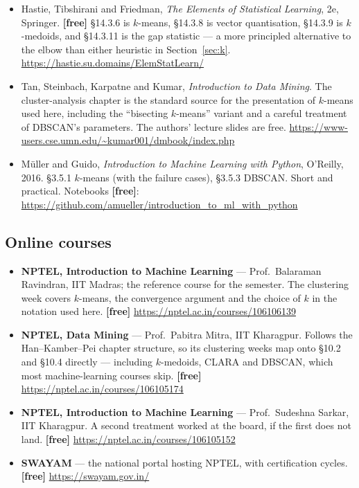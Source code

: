 \documentclass[11pt]{article}
\begin{document}
\begin{itemize}[leftmargin=*]
  \item Hastie, Tibshirani and Friedman, \emph{The Elements of Statistical
    Learning}, 2e, Springer. \textbf{[free]} \S14.3.6 is $k$-means, \S14.3.8
    is vector quantisation, \S14.3.9 is $k$-medoids, and \S14.3.11 is the
    gap statistic --- a more principled alternative to the elbow than either
    heuristic in Section~\ref{sec:k}.
    \url{https://hastie.su.domains/ElemStatLearn/}
  \item Tan, Steinbach, Karpatne and Kumar, \emph{Introduction to Data
    Mining}. The cluster-analysis chapter is the standard source for the
    presentation of $k$-means used here, including the ``bisecting
    $k$-means'' variant and a careful treatment of DBSCAN's parameters. The
    authors' lecture slides are free.
    \url{https://www-users.cse.umn.edu/~kumar001/dmbook/index.php}
  \item M\"uller and Guido, \emph{Introduction to Machine Learning with
    Python}, O'Reilly, 2016. \S3.5.1 $k$-means (with the failure cases),
    \S3.5.3 DBSCAN. Short and practical. Notebooks \textbf{[free]}:
    \url{https://github.com/amueller/introduction_to_ml_with_python}
\end{itemize}

\subsection*{Online courses}

\begin{sloppypar}
\begin{itemize}[leftmargin=*]
  \item \textbf{NPTEL, Introduction to Machine Learning} --- Prof.\ Balaraman
    Ravindran, IIT Madras; the reference course for the semester. The
    clustering week covers $k$-means, the convergence argument and the choice
    of $k$ in the notation used here. \textbf{[free]}
    \url{https://nptel.ac.in/courses/106106139}
  \item \textbf{NPTEL, Data Mining} --- Prof.\ Pabitra Mitra, IIT Kharagpur.
    Follows the Han--Kamber--Pei chapter structure, so its clustering weeks
    map onto \S10.2 and \S10.4 directly --- including $k$-medoids, CLARA and
    DBSCAN, which most machine-learning courses skip. \textbf{[free]}
    \url{https://nptel.ac.in/courses/106105174}
  \item \textbf{NPTEL, Introduction to Machine Learning} --- Prof.\ Sudeshna
    Sarkar, IIT Kharagpur. A second treatment worked at the board, if the
    first does not land. \textbf{[free]}
    \url{https://nptel.ac.in/courses/106105152}
  \item \textbf{SWAYAM} --- the national portal hosting NPTEL, with
    certification cycles. \textbf{[free]} \url{https://swayam.gov.in/}
\end{itemize}
\end{sloppypar}
\end{document}
